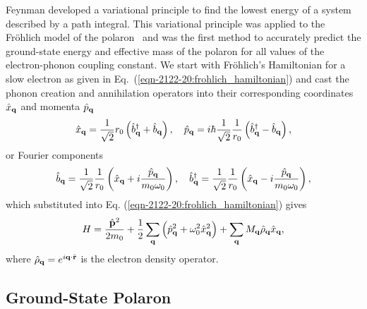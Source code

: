 Feynman developed a variational principle to find the lowest energy of a system described by a path integral. This variational principle was applied to the Fr\"ohlich model of the polaron~\cite{frohlich_electrons_1954} and was the first method to accurately predict the ground-state energy and effective mass of the polaron for all values of the electron-phonon coupling constant. We start with Fr\"ohlich's Hamiltonian for a slow electron as given in Eq.~(\ref{eqn-2122-20:frohlich_hamiltonian}) and cast the phonon creation and annihilation operators into their corresponding coordinates $\hat{x}_{\vb{q}}$ and momenta $\hat{p}_{\vb{q}}$
\begin{equation}
   \hat{x}_{\vb{q}} = \frac{1}{\sqrt{2}} r_0 \left(\hat{b}^\dagger_{\vb{q}} + \hat{b}_{\vb{q}} \right), \quad \hat{p}_{\vb{q}} = i\hbar \frac{1}{\sqrt{2}} \frac{1}{r_0} \left(\hat{b}^\dagger_{\vb{q}} - \hat{b}_{\vb{q}} \right),
\label{eqn-22-1}
\end{equation}
or Fourier components
\begin{equation}
   \hat{b}_{\vb{q}} = \frac{1}{\sqrt{2}} \frac{1}{r_0} \left(\hat{x}_{\vb{q}} + i \frac{\hat{p}_{\vb{q}}}{m_0 \omega_0} \right), \quad \hat{b}^\dagger_{\vb{q}} = \frac{1}{\sqrt{2}} \frac{1}{r_0} \left(\hat{x}_{\vb{q}} - i \frac{\hat{p}_{\vb{q}}}{m_0 \omega_0} \right),
\label{eqn-22-2}
\end{equation}
which substituted into Eq. (\ref{eqn-2122-20:frohlich_hamiltonian}) gives
\begin{equation}
    H = \frac{\hat{\vb{p}}^2}{2 m_0} + \frac{1}{2} \sum_{\vb{q}} \left( \hat{p}_{\vb{q}}^2 + \omega_0^2 \hat{x}_{\vb{q}}^2 \right) + \sum_{\vb{q}} M_{\vb{q}} \hat{\rho}_{\vb{q}} \hat{x}_{\vb{q}},
\label{eqn-22-3}
\end{equation}
where $\hat{\rho}_{\vb{q}} = e^{i \vb{q} \cdot \hat{\vb{r}}}$ is the electron density operator.

\subsection{Ground-State Polaron}
\label{subsec:2-2-1}

